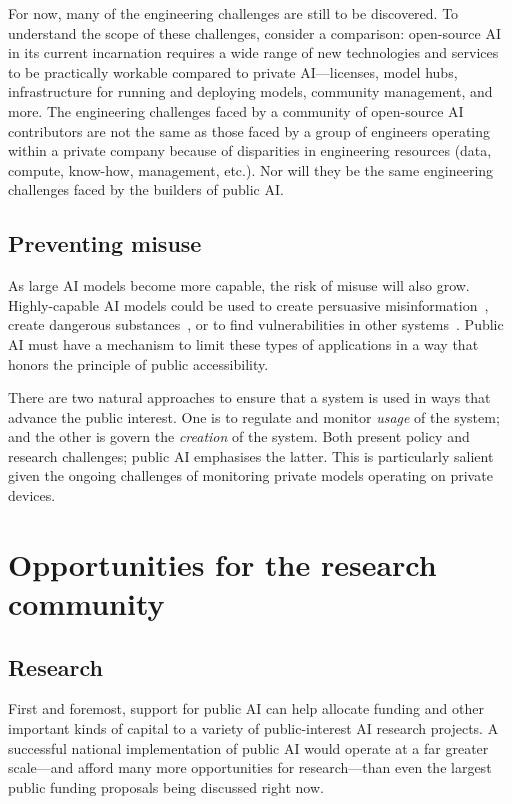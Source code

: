 \documentclass{article}
\begin{document}
For now, many of the engineering challenges are still to be discovered. To understand the scope of these challenges, consider a comparison: open-source AI in its current incarnation requires a wide range of new technologies and services to be practically workable compared to private AI---licenses, model hubs, infrastructure for running and deploying models, community management, and more.
The engineering challenges faced by a community of open-source AI contributors are not the same as those faced by a group of engineers operating within a private company because of disparities in engineering resources (data, compute, know-how, management, etc.). Nor will they be the same engineering challenges faced by the builders of public AI.

\subsection{Preventing misuse}
As large AI models become more capable, the risk of misuse will also grow. Highly-capable AI models could be used to create persuasive misinformation~\cite{torzdl2019faceswap,mirsky2021creation,zhou2023synthetic,gao2023comparing,gravel2023learning}, create dangerous substances~\cite{soice2023can,bran2023chemcrow,guo2023indeed}, or to find vulnerabilities in other systems~\cite{deng2023pentestgpt,gupta2023chatgpt}. Public AI must have a mechanism to limit these types of applications in a way that honors the principle of public accessibility.

There are two natural approaches to ensure that a system is used in ways that advance the public interest. One is to regulate and monitor \emph{usage} of the system; and the other is govern the \emph{creation} of the system. Both present policy and research challenges; public AI emphasises the latter. This is particularly salient given the ongoing challenges of monitoring private models operating on private devices.

\section{Opportunities for the research community}

\subsection{Research}
First and foremost, support for public AI can help allocate funding and other important kinds of capital to a variety of public-interest AI research projects. A successful national implementation of public AI would operate at a far greater scale---and afford many more opportunities for research---than even the largest public funding proposals being discussed right now.
\end{document}
